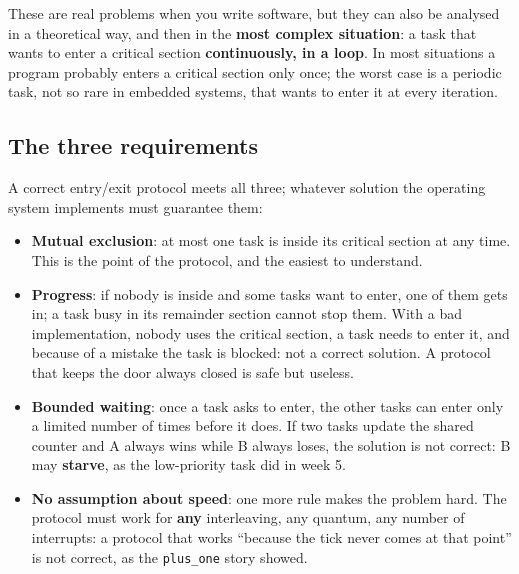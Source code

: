 These are real problems when you write software, but they can also be analysed in a theoretical way, and then in the \textbf{most complex situation}: a task that wants to enter a critical section \textbf{continuously, in a loop}. In most situations a program probably enters a critical section only once; the worst case is a periodic task, not so rare in embedded systems, that wants to enter it at every iteration.

\subsection{The three requirements}
A correct entry/exit protocol meets all three; whatever solution the operating system implements must guarantee them:
\begin{itemize}
    \item \textbf{Mutual exclusion}: at most one task is inside its critical section at any time. This is the point of the protocol, and the easiest to understand.
    \item \textbf{Progress}: if nobody is inside and some tasks want to enter, one of them gets in; a task busy in its remainder section cannot stop them. With a bad implementation, nobody uses the critical section, a task needs to enter it, and because of a mistake the task is blocked: not a correct solution. A protocol that keeps the door always closed is safe but useless.
    \item \textbf{Bounded waiting}: once a task asks to enter, the other tasks can enter only a limited number of times before it does. If two tasks update the shared counter and A always wins while B always loses, the solution is not correct: B may \textbf{starve}, as the low-priority task did in week 5.
    \item \textbf{No assumption about speed}: one more rule makes the problem hard. The protocol must work for \textbf{any} interleaving, any quantum, any number of interrupts: a protocol that works ``because the tick never comes at that point'' is not correct, as the \texttt{plus\_one} story showed.
\end{itemize}

